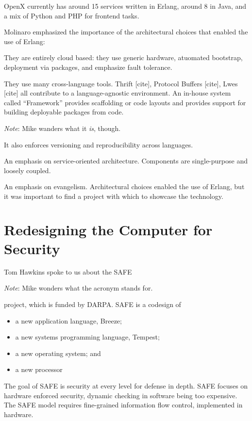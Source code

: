 \documentclass{jfp1}
\newenvironment{ipar}[0]%
 {\begin{list}{}%
 {\setlength{\leftmargin}{1cm}}%
\item[]%
 }
 {\end{list}}
\newcommand\needcite{{\color{red} [cite]}\xspace}
\newcommand{\note}[1]{ \begin{ipar}  {\color{Gray} \textit{Note}: #1} \end{ipar}}
\begin{document}
OpenX currently has around 15 services written in Erlang, around 8 in
Java, and a mix of Python and PHP for frontend tasks.

Molinaro emphasized the importance of the architectural choices that
enabled the use of Erlang:

\begin{itemize}

\item They are entirely cloud based: they use generic hardware,
atuomated bootstrap, deployment via packages, and emphasize fault
tolerance.

\item They use many cross-language tools. Thrift\needcite, Protocol
Buffers\needcite, Lwes\needcite all contribute to a language-agnostic
environment. An in-house system called ``Framework'' provides
scaffolding or code layouts and provides support for building
deployable packages from code.  \note{Mike wanders what it \emph{is},
  though.}
It also enforces versioning and
reproducibility across languages.

\item An emphasis on service-oriented architecture. Components are
single-purpose and loosely coupled.

\item An emphasis on evangelism. Architectural choices enabled the use
of Erlang, but it was important to find a project with which to
showcase the technology.

\end{itemize}

\section{Redesigning the Computer for Security}


Tom Hawkins spoke to us about the SAFE \note{Mike wonders what the
  acronym stands for.}  project, which is funded
by DARPA. SAFE is a codesign of 

\begin{itemize}
\item a new application language, Breeze;
\item a new systems programming language, Tempest;
\item a new operating system; and
\item a new processor 
\end{itemize}

The goal of SAFE is security at every level for defense in depth.
SAFE focuses on hardware enforced security, dynamic checking
in software being too expensive. The SAFE model requires fine-grained
information flow control, implemented in hardware.
\end{document}
